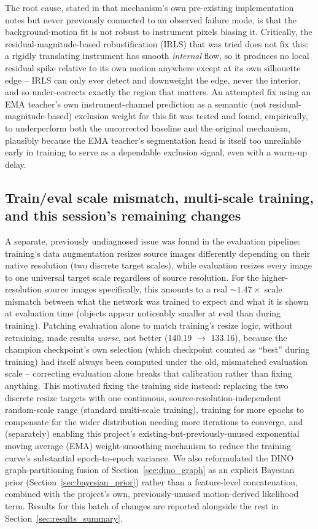 \documentclass[conference]{IEEEtran}
\begin{document}
The root cause, stated in that mechanism's own pre-existing
implementation notes but never previously connected to an observed
failure mode, is that the background-motion fit is not robust to
instrument pixels biasing it. Critically, the residual-magnitude-based
robustification (IRLS) that was tried does not fix this: a rigidly
translating instrument has smooth \emph{internal} flow, so it produces no
local residual spike relative to its own motion anywhere except at its
own silhouette edge -- IRLS can only ever detect and downweight the
edge, never the interior, and so under-corrects exactly the region that
matters. An attempted fix using an EMA teacher's own instrument-channel
prediction as a semantic (not residual-magnitude-based) exclusion weight
for this fit was tested and found, empirically, to underperform both the
uncorrected baseline and the original mechanism, plausibly because the
EMA teacher's segmentation head is itself too unreliable early in
training to serve as a dependable exclusion signal, even with a
warm-up delay.

\subsection{Train/eval scale mismatch, multi-scale training, and this session's remaining changes}
\label{sec:this_session}

A separate, previously undiagnosed issue was found in the evaluation
pipeline: training's data augmentation resizes source images differently
depending on their native resolution (two discrete target scales), while
evaluation resizes every image to one universal target scale regardless
of source resolution. For the higher-resolution source images specifically,
this amounts to a real $\sim\!1.47\times$ scale mismatch between what the
network was trained to expect and what it is shown at evaluation time
(objects appear noticeably smaller at eval than during training).
Patching evaluation alone to match training's resize logic, without
retraining, made results \emph{worse}, not better (140.19 $\to$ 133.16),
because the champion checkpoint's own selection (which checkpoint counted
as ``best'' during training) had itself always been computed under the
old, mismatched evaluation scale -- correcting evaluation alone breaks
that calibration rather than fixing anything. This motivated fixing the
training side instead: replacing the two discrete resize targets with one
continuous, source-resolution-independent random-scale range (standard
multi-scale training), training for more epochs to compensate for the
wider distribution needing more iterations to converge, and (separately)
enabling this project's existing-but-previously-unused exponential moving
average (EMA) weight-smoothing mechanism to reduce the training curve's
substantial epoch-to-epoch variance. We also reformulated the DINO
graph-partitioning fusion of Section~\ref{sec:dino_graph} as an explicit
Bayesian prior (Section~\ref{sec:bayesian_prior}) rather than a
feature-level concatenation, combined with the project's own,
previously-unused motion-derived likelihood term. Results for this batch
of changes are reported alongside the rest in
Section~\ref{sec:results_summary}.
\end{document}
